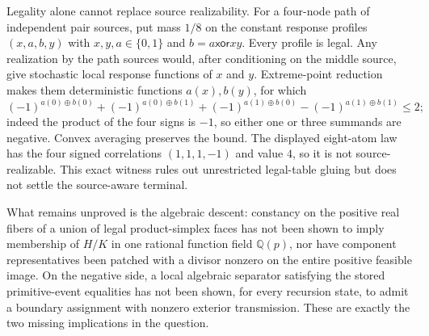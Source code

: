 Legality alone cannot replace source realizability.  For a four-node path of independent pair sources, put mass \(1/8\) on the constant response profiles \((x,a,b,y)\) with \(x,y,a\in\{0,1\}\) and \(b=a\mathbin{\mathsf{xor}}xy\).  Every profile is legal.  Any realization by the path sources would, after conditioning on the middle source, give stochastic local response functions of \(x\) and \(y\).  Extreme-point reduction makes them deterministic functions \(a(x),b(y)\), for which
\[
 (-1)^{a(0)\oplus b(0)}+(-1)^{a(0)\oplus b(1)}+(-1)^{a(1)\oplus b(0)}-(-1)^{a(1)\oplus b(1)}\le2;
\]
indeed the product of the four signs is \(-1\), so either one or three summands are negative.  Convex averaging preserves the bound.  The displayed eight-atom law has the four signed correlations \((1,1,1,-1)\) and value \(4\), so it is not source-realizable.  This exact witness rules out unrestricted legal-table gluing but does not settle the source-aware terminal.

What remains unproved is the algebraic descent: constancy on the positive real fibers of a union of legal product-simplex faces has not been shown to imply membership of \(H/K\) in one rational function field \(\mathbb Q(p)\), nor have component representatives been patched with a divisor nonzero on the entire positive feasible image.  On the negative side, a local algebraic separator satisfying the stored primitive-event equalities has not been shown, for every recursion state, to admit a boundary assignment with nonzero exterior transmission.  These are exactly the two missing implications in the question.
